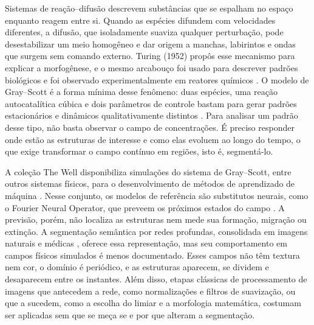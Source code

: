 \documentclass[12pt]{article}
\begin{document}
Sistemas de reação--difusão descrevem substâncias que se espalham no espaço enquanto reagem entre si. Quando as espécies difundem com velocidades diferentes, a difusão, que isoladamente suaviza qualquer perturbação, pode desestabilizar um meio homogêneo e dar origem a manchas, labirintos e ondas que surgem sem comando externo. Turing (1952) propôs esse mecanismo para explicar a morfogênese, e o mesmo arcabouço foi usado para descrever padrões biológicos \cite{kondo2010,murray2003} e foi observado experimentalmente em reatores químicos \cite{lee1993}. O modelo de Gray--Scott é a forma mínima desse fenômeno: duas espécies, uma reação autocatalítica cúbica e dois parâmetros de controle bastam para gerar padrões estacionários e dinâmicos qualitativamente distintos \cite{gray1983,pearson1993}. Para analisar um padrão desse tipo, não basta observar o campo de concentrações. É preciso responder onde estão as estruturas de interesse e como elas evoluem ao longo do tempo, o que exige transformar o campo contínuo em regiões, isto é, segmentá-lo.

A coleção The Well disponibiliza simulações do sistema de Gray--Scott, entre outros sistemas físicos, para o desenvolvimento de métodos de aprendizado de máquina \cite{ohana2024well}. Nesse conjunto, os modelos de referência são substitutos neurais, como o Fourier Neural Operator, que preveem os próximos estados do campo \cite{li2021fno}. A previsão, porém, não localiza as estruturas nem mede sua formação, migração ou extinção. A segmentação semântica por redes profundas, consolidada em imagens naturais e médicas \cite{long2015fcn,ronneberger2015unet,xie2021segformer,cheng2022mask2former}, oferece essa representação, mas seu comportamento em campos físicos simulados é menos documentado. Esses campos não têm textura nem cor, o domínio é periódico, e as estruturas aparecem, se dividem e desaparecem entre os instantes. Além disso, etapas clássicas de processamento de imagens que antecedem a rede, como normalizações e filtros de suavização, ou que a sucedem, como a escolha do limiar e a morfologia matemática, costumam ser aplicadas sem que se meça se e por que alteram a segmentação.
\end{document}

